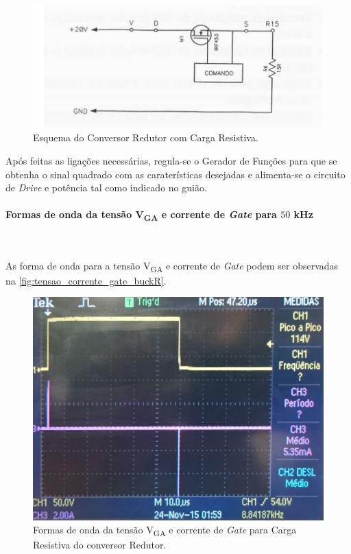 \documentclass[a4paper,11pt]{article}
\numberwithin{equation}{section}
\begin{document}
\begin{figure}[h]
	\centering
	\includegraphics[keepaspectratio=true, scale=0.8]{teoricas/Redutor_R}
	\caption{Esquema do Conversor Redutor com Carga Resistiva.}
	\label{fig:Red_R}
	\vspace{-0.8em}
\end{figure}

	Após feitas as ligações necessárias, regula-se o Gerador de Funções para que se obtenha o sinal quadrado com as caraterísticas desejadas e alimenta-se o circuito de \textit{Drive} e potência tal como indicado no guião.
	
\paragraph{Formas de onda da tensão V\textsubscript{GA} e corrente de \textit{Gate} para $50$ kHz}\mbox{}\

As forma de onda para a tensão V\textsubscript{GA} e corrente de \textit{Gate} podem ser observadas na \autoref{fig:tensao_corrente_gate_buckR}.

\begin{figure}[h]
	\centering
	\includegraphics[keepaspectratio=true, scale=0.13]{img/figs/tensao_corrente_gate_buckR}
	\caption{Formas de onda da tensão V\textsubscript{GA} e corrente de \textit{Gate} para Carga Resistiva do conversor Redutor.}
	\label{fig:tensao_corrente_gate_buckR}
	\vspace{-0.8em}
\end{figure} 
\end{document}

